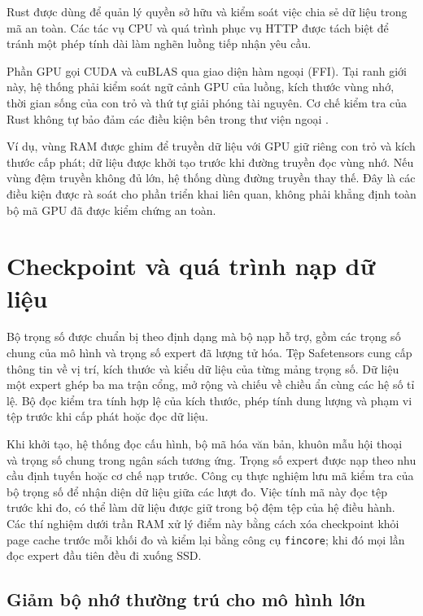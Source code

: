Rust được dùng để quản lý quyền sở hữu và kiểm soát việc chia sẻ dữ liệu trong mã an toàn. Các tác vụ CPU và quá trình phục vụ HTTP được tách biệt để tránh một phép tính dài làm nghẽn luồng tiếp nhận yêu cầu.

Phần GPU gọi CUDA và cuBLAS qua giao diện hàm ngoại (FFI). Tại ranh giới này, hệ thống phải kiểm soát ngữ cảnh GPU của luồng, kích thước vùng nhớ, thời gian sống của con trỏ và thứ tự giải phóng tài nguyên. Cơ chế kiểm tra của Rust không tự bảo đảm các điều kiện bên trong thư viện ngoại \cite{moe_tierengine_arch}.

Ví dụ, vùng RAM được ghim để truyền dữ liệu với GPU giữ riêng con trỏ và kích thước cấp phát; dữ liệu được khởi tạo trước khi đường truyền đọc vùng nhớ. Nếu vùng đệm truyền không đủ lớn, hệ thống dùng đường truyền thay thế. Đây là các điều kiện được rà soát cho phần triển khai liên quan, không phải khẳng định toàn bộ mã GPU đã được kiểm chứng an toàn.

\section{Checkpoint và quá trình nạp dữ liệu}

Bộ trọng số được chuẩn bị theo định dạng mà bộ nạp hỗ trợ, gồm các trọng số chung của mô hình và trọng số expert đã lượng tử hóa. Tệp Safetensors cung cấp thông tin về vị trí, kích thước và kiểu dữ liệu của từng mảng trọng số. Dữ liệu một expert ghép ba ma trận cổng, mở rộng và chiếu về chiều ẩn cùng các hệ số tỉ lệ. Bộ đọc kiểm tra tính hợp lệ của kích thước, phép tính dung lượng và phạm vi tệp trước khi cấp phát hoặc đọc dữ liệu.

Khi khởi tạo, hệ thống đọc cấu hình, bộ mã hóa văn bản, khuôn mẫu hội thoại và trọng số chung trong ngân sách tương ứng. Trọng số expert được nạp theo nhu cầu định tuyến hoặc cơ chế nạp trước. Công cụ thực nghiệm lưu mã kiểm tra của bộ trọng số để nhận diện dữ liệu giữa các lượt đo. Việc tính mã này đọc tệp trước khi đo, có thể làm dữ liệu được giữ trong bộ đệm tệp của hệ điều hành. Các thí nghiệm dưới trần RAM xử lý điểm này bằng cách xóa checkpoint khỏi page cache trước mỗi khối đo và kiểm lại bằng công cụ \texttt{fincore}; khi đó mọi lần đọc expert đầu tiên đều đi xuống SSD.

\subsection{Giảm bộ nhớ thường trú cho mô hình lớn}

